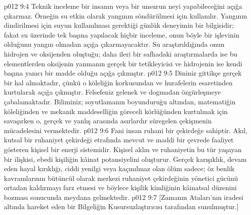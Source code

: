\vs p012 9:4 Teknik inceleme bir insanın veya bir unsurun neyi yapabileceğini açığa çıkarmaz. Örneğin su etkin olarak yangının söndürülmesi için kullanılır. Yangının dindirilmesi için suyun kullanılması gerektiği günlük deneyimin bir bilgisidir; fakat su üzerinde tek başına yapılacak hiçbir inceleme, onun böyle bir işlevinin olduğunu yangın olmadan açığa çıkarmayacaktır. Su araştırıldığında onun hidrojen ve oksijenden oluştuğu; daha ileri bir safhadaki araştırmalarda ise bu elementlerden oksijenin yanmanın gerçek bir tetikleyicisi ve hidrojenin ise kendi başına yanıcı bir madde olduğu açığa çıkmıştır.
\vs p012 9:5 Dininiz gittikçe gerçek bir hal almaktadır, çünkü o köleliğin korkusundan ve hurafelerin esaretinden kurtularak açığa çıkmıştır. Felsefeniz gelenek ve dogmadan özgürleşmeye çabalamaktadır. Biliminiz; soyutlamanın boyunduruğu altından, matematiğin köleliğinden ve mekanik maddeselliğin göreceli körlüğünden kurtulmak için savaşırken o, gerçek ve yanlış arasında asırlardır süregelen çekişmenin mücadelesini vermektedir.
\vs p012 9:6 Fani insan ruhani bir çekirdeğe sahiptir. Akıl, kutsal bir ruhaniyet çekirdeği etrafında mevcut ve maddi bir çevrede faaliyet gösteren kişisel bir enerji sistemidir. Kişisel aklın ve ruhaniyetin bu tür yaşayan bir ilişkisi, ebedi kişiliğin kâinat potansiyelini oluşturur. Gerçek karışıklık, devam eden hayal kırıklığı, ciddi yenilgi veya kaçınılmaz olan ölüm sadece; öz benlik kavramlarının bütüncül olarak merkezi ruhaniyet çekirdeğinin yönetici gücünü ortadan kaldırmayı farz etmesi ve böylece kişilik kimliğinin kâinatsal düzenini bozması sonucunda meydana gelmektedir.
\vs p012 9:7 [Zamanın Ataları’nın iradesi altında hareket eden bir Bilgeliğin Kusursuzlaştırıcısı tarafından sunulmuştur.]
